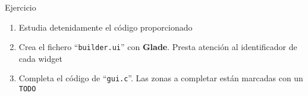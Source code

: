 \documentclass{mybeamer}
\begin{document}
\begin{framesubsec}{Ejercicio}
	\begin{enumerate}
		\item Estudia detenidamente el código proporcionado
		\item Crea el fichero ``\texttt{builder.ui}'' con
			\textbf{Glade}. Presta atención al identificador de cada
			widget
		\item Completa el código de ``\texttt{gui.c}''. Las zonas a
			completar están marcadas con un \texttt{TODO}
	\end{enumerate}
\end{framesubsec}
\end{document}
